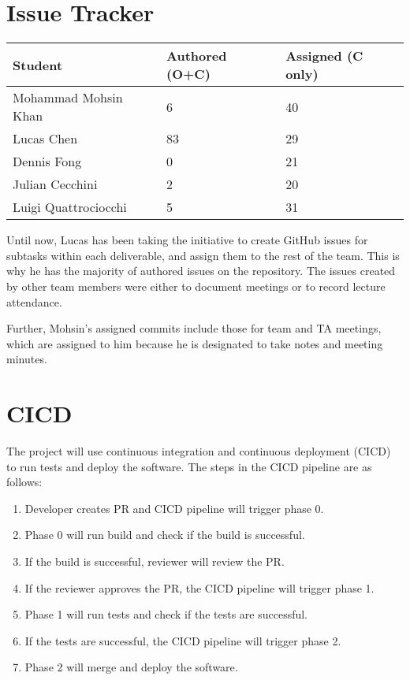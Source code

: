 \documentclass{article}
\begin{document}
\section{Issue Tracker}

\begin{table}[H]
\centering
\begin{tabular}{lll}
\toprule
\textbf{Student} & \textbf{Authored (O+C)} & \textbf{Assigned (C only)}\\
\midrule
Mohammad Mohsin Khan & 6 & 40\\
Lucas Chen & 83 & 29\\
Dennis Fong & 0 & 21\\
Julian Cecchini & 2 & 20\\
Luigi Quattrociocchi & 5 & 31\\
\bottomrule
\end{tabular}
\end{table}

Until now, Lucas has been taking the initiative to create GitHub issues for
subtasks within each deliverable, and assign them to the rest of the team.
This is why he has the majority of authored issues on the repository. The
issues created by other team members were either to document meetings or
to record lecture attendance.

Further, Mohsin's assigned commits include those for team and TA meetings, which
are assigned to him because he is designated to take notes and meeting minutes.

\section{CICD}

The project will use continuous integration and continuous deployment (CICD) to run tests and deploy the software.
The steps in the CICD pipeline are as follows:
\begin{enumerate}
  \item Developer creates PR and CICD pipeline will trigger phase 0.
  \item Phase 0 will run build and check if the build is successful.
  \item If the build is successful, reviewer will review the PR.
  \item If the reviewer approves the PR, the CICD pipeline will trigger phase 1.
  \item Phase 1 will run tests and check if the tests are successful.
  \item If the tests are successful, the CICD pipeline will trigger phase 2.
  \item Phase 2 will merge and deploy the software.
\end{enumerate}



\end{document}
